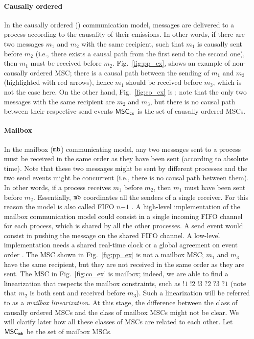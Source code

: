 \paragraph{\bf Causally ordered}
In the causally ordered (\co) communication model, messages are delivered to a process according to the causality of their emissions. In other words, if there are two messages $m_1$ and $m_2$ with the same recipient, such that $m_1$ is causally sent before $m_2$ (i.e., there exists a causal path from the first send to the second one), then $m_1$ must be received before $m_2$. Fig.~\ref{fig:pp_ex}, shows an example of non-causally ordered MSC; there is a causal path between the sending of $m_1$ and $m_3$ (highlighted with red arrows), hence $m_1$ should be received before $m_3$, which is not the case here. On the other hand, Fig.~\ref{fig:co_ex} is \co; note that the only two messages with the same recipient are $m_2$ and $m_3$, but there is no causal path between their respective send events 
 $\mathsf{MSC}_{\mathtt{co}}$ is the set of causally ordered MSCs.




\paragraph{\bf Mailbox}
In the mailbox ($\mathtt{mb}$) communicating model, any two messages sent to a process  must be received in the same order as they have been sent (according to absolute time). Note that these two messages might be sent by different processes and the two send events might be concurrent (i.e., there is no causal path between them). In other words, if a process  receives $m_1$ before $m_2$, then $m_1$ must have been sent before $m_2$. Essentially, $\mathtt{mb}$ coordinates all the senders of a single receiver. For this reason the model is also called FIFO $n\mathsf{-}1$ \cite{DBLP:journals/fac/ChevrouHQ16}.   A high-level implementation of the mailbox communication model could consist in a single incoming FIFO channel for each process, which is shared by all the other processes. A send event would consist in pushing the message on the shared FIFO channel.
A low-level implementation needs a shared real-time clock \cite{cristian1999timed} or a global agreement on event order \cite{defago2004total, raynal2010communication}.
The MSC shown in Fig.~\ref{fig:pp_ex} is not a mailbox MSC; $m_1$ and $m_3$ have the same recipient, but they are not received in the same order as they are sent. The MSC in Fig.~\ref{fig:co_ex} is mailbox; indeed, we are able to find a linearization that respects the mailbox constraints, such as $!1\;!2\;!3\;?2\;?3\;?1$ (note that $m_2$ is both sent and received before $m_3$). Such a linearization will be referred to as a \emph{mailbox linearization}. At this stage, the difference between the class of causally ordered MSCs and the class of mailbox MSCs might not be clear. We will clarify later how all these classes of MSCs are related to each other. Let $\mathsf{MSC}_{\mathtt{mb}}$ be the set of mailbox MSCs.

